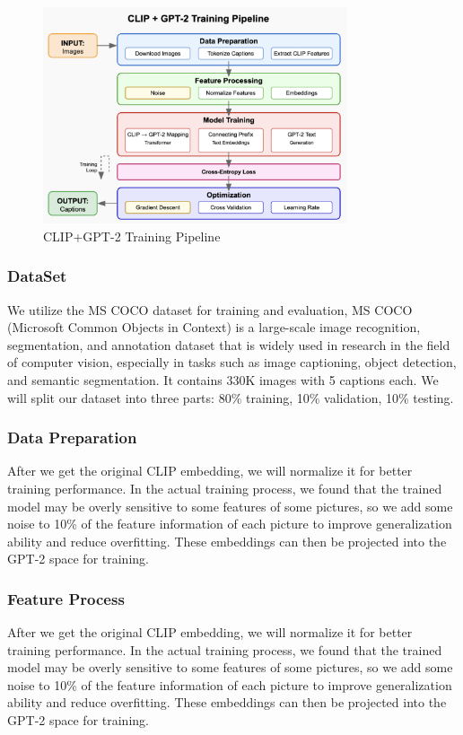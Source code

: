 \documentclass[11pt]{article}
\begin{document}
    \begin{figure}[h]
    \centering
    \includegraphics[width=0.8\textwidth]{figure1.png}
    \caption{CLIP+GPT-2 Training Pipeline}
    \label{fig:architecture}
    \end{figure}

    \subsubsection{DataSet}

    We utilize the MS COCO dataset \cite{COCO}for training and evaluation, 
    MS COCO (Microsoft Common Objects in Context) 
    is a large-scale image recognition, segmentation, 
    and annotation dataset that is widely used in research 
    in the field of computer vision, especially in tasks 
    such as image captioning, object detection, and semantic 
    segmentation. It contains 330K images with 5 captions each. 
    We will split our dataset into three parts: 80\% training, 10\% validation, 10\% testing.

    \subsubsection{Data Preparation}
    After we get the original CLIP embedding, we will normalize it for better training performance. In the actual training process, 
    we found that the trained model may be overly sensitive to some features of some pictures, 
    so we add some noise to 10\% of the feature information of each picture to improve generalization ability and reduce overfitting. 
    These embeddings can then be projected into the GPT-2 space for training.
    \subsubsection{Feature Process}
    After we get the original CLIP embedding, 
    we will normalize it for better training performance. 
    In the actual training process, we found that the 
    trained model may be overly sensitive to some 
    features of some pictures, so we add some noise to 
    10\% of the feature information of each picture to 
    improve generalization ability and reduce overfitting. These embeddings can then be projected into the GPT-2 space for training.
\end{document}
